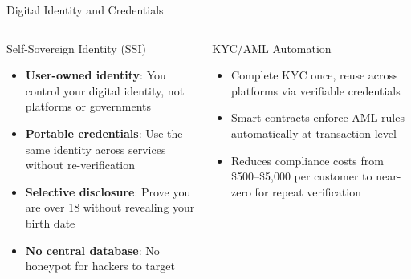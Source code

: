 \documentclass[8pt,aspectratio=169]{beamer}
\begin{document}
\begin{frame}{Digital Identity and Credentials}
\begin{columns}[T]
\begin{block}{Self-Sovereign Identity (SSI)}
\footnotesize
\begin{itemize}
  \item \textbf{User-owned identity}: You control your digital identity, not platforms or governments
  \item \textbf{Portable credentials}: Use the same identity across services without re-verification
  \item \textbf{Selective disclosure}: Prove you are over 18 without revealing your birth date
  \item \textbf{No central database}: No honeypot for hackers to target
\end{itemize}
\end{block}
\vspace{2mm}
\begin{block}{KYC/AML Automation}
\footnotesize
\begin{itemize}
  \item Complete KYC once, reuse across platforms via verifiable credentials
  \item Smart contracts enforce AML rules automatically at transaction level
  \item Reduces compliance costs from \$500--\$5,000 per customer to near-zero for repeat verification
\end{itemize}
\end{block}


\end{columns}
\end{frame}
\end{document}
